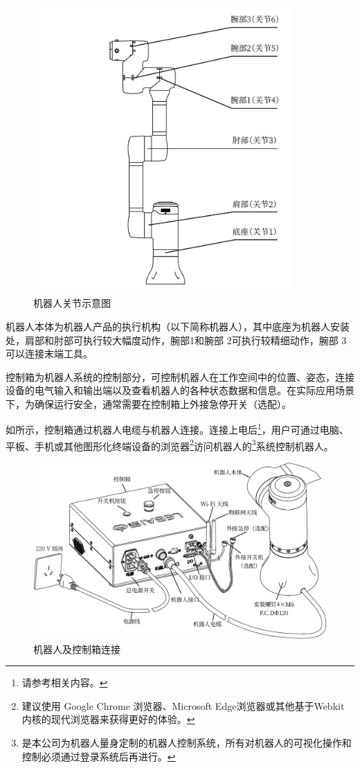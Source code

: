 \begin{figure}[ht]
    \centering
    \includegraphics[height=11cm]{image/arms.pdf}
    \caption{机器人关节示意图}
    \label{fig:机器人关节示意图}
\end{figure}

机器人本体为机器人产品的执行机构（以下简称机器人），其中底座为机器人安装处，肩部和肘部可执行较大幅度动作，腕部1和腕部 2可执行较精细动作，腕部 3 可以连接末端工具。

\clearpage

控制箱为机器人系统的控制部分，可控制机器人在工作空间中的位置、姿态，连接设备的电气输入和输出端以及查看机器人的各种状态数据和信息。在实际应用场景下，为确保运行安全，通常需要在控制箱上外接急停开关（选配）。

如所示，控制箱通过机器人电缆与机器人连接。连接上电后\footnote{请参考相关内容。}，用户可通过电脑、平板、手机或其他图形化终端设备的浏览器\footnote{建议使用 Google Chrome 浏览器、Microsoft Edge浏览器或其他基于Webkit 内核的现代浏览器来获得更好的体验。 }访问机器人的\LM\footnote{\LM 是本公司为机器人量身定制的机器人控制系统，所有对机器人的可视化操作和控制必须通过登录\LM 系统后再进行。}系统控制机器人。

\begin{figure}[h!]
    \centering
    \includegraphics[width=\textwidth]{line_graphs/robot_links.pdf}
    \caption{机器人及控制箱连接}
    \label{fig:机器人本体及控制箱连接}
\end{figure}

